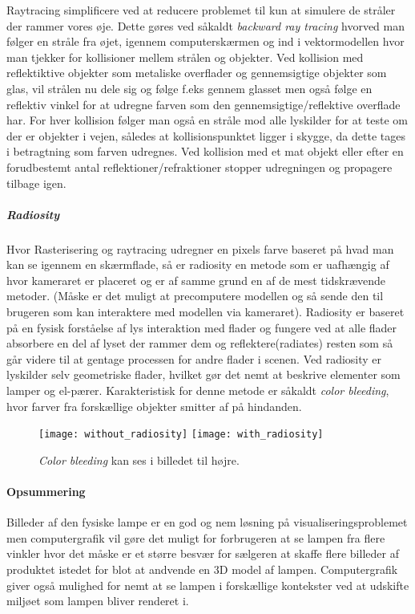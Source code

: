 \newline Raytracing simplificere ved at reducere problemet til kun at simulere de stråler der rammer vores øje. Dette gøres ved såkaldt \textit{backward ray tracing} hvorved man følger en stråle fra øjet, igennem computerskærmen og ind i vektormodellen hvor man tjekker for kollisioner mellem strålen og objekter. Ved kollision med reflektiktive objekter som metaliske overflader og gennemsigtige objekter som glas, vil strålen nu dele sig og følge f.eks gennem glasset men også følge en reflektiv vinkel for at udregne farven som den gennemsigtige/reflektive overflade har. For hver kollision følger man også en stråle mod alle lyskilder for at teste om der er objekter i vejen, således at kollisionspunktet ligger i skygge, da dette tages i betragtning som farven udregnes. Ved kollision med et mat objekt eller efter en forudbestemt antal reflektioner/refraktioner stopper udregningen og propagere tilbage igen.
\subparagraph{Radiosity}
Hvor Rasterisering og raytracing udregner en pixels farve baseret på hvad man kan se igennem en skærmflade, så er radiosity en metode som er uafhængig af hvor kameraret er placeret og er af samme grund en af de mest tidskrævende metoder. (Måske er det muligt at precomputere modellen og så sende den til brugeren som kan interaktere med modellen via kameraret). 
\newline Radiosity er baseret på en fysisk forståelse af lys interaktion med flader og fungere ved at alle flader absorbere en del af lyset der rammer dem og reflektere(radiates) resten som så går videre til at gentage processen for andre flader i scenen. Ved radiosity er lyskilder selv geometriske flader, hvilket gør det nemt at beskrive elementer som lamper og el-pærer. Karakteristisk for denne metode er såkaldt \textit{color bleeding}, hvor farver fra forskællige objekter smitter af på hindanden.
\begin{figure}[H]
    \centering
    \texttt{[image: without\_radiosity]}
    \texttt{[image: with\_radiosity]}
    \caption{\textit{Color bleeding} kan ses i billedet til højre.}
    \label{fig:colorbleeding}
\end{figure}

\paragraph{Opsummering}
Billeder af den fysiske lampe er en god og nem løsning på visualiseringsproblemet men computergrafik vil gøre det muligt for forbrugeren at se lampen fra flere vinkler hvor det måske er et større besvær for sælgeren at skaffe flere billeder af produktet istedet for blot at andvende en 3D model af lampen. Computergrafik giver også mulighed for nemt at se lampen i forskællige kontekster ved at udskifte miljøet som lampen bliver renderet i. 

